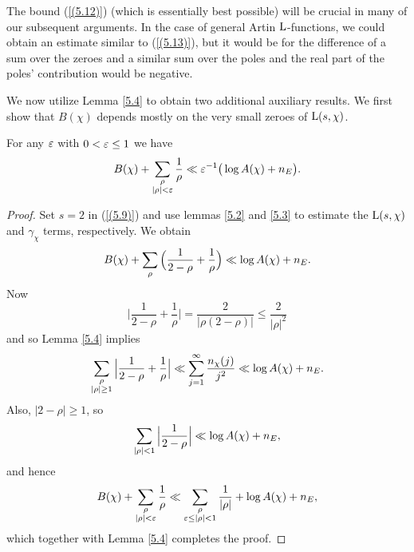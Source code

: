 \documentclass[./main]{subfiles}
\begin{document}
The bound (\ref{(5.12)}) (which is essentially best possible) will be crucial in many of our subsequent arguments. In the case of general Artin $\operatorname{L}$-functions, we could obtain an estimate similar to (\ref{(5.13)}), but it would be for the difference of a sum over the zeroes and a similar sum over the poles and the real part of the poles' contribution would be negative.

We now utilize Lemma \ref{5.4} to obtain two additional auxiliary results. We first show that $B(\chi)$ depends mostly on the very small zeroes of $\operatorname{L}(s,\chi)$.
\begin{lemma}\label{5.5}
For any $\varepsilon$ with $0 < \varepsilon \leq 1$ we have
\[B(\chi) + \sum_{\substack{\rho\\|\rho|<\varepsilon}}{\frac{1}{\rho}}\ll \varepsilon^{-1}\big(\log{A(\chi)}+n_E\big).\]
\end{lemma}
\begin{proof}
Set $s=2$ in (\ref{(5.9)}) and use lemmas \ref{5.2} and \ref{5.3} to estimate the $\operatorname{L}(s,\chi)$ and $\gamma_\chi$ terms, respectively. We obtain
\[B(\chi) + \sum_{\rho}{\Big(\frac{1}{2-\rho}+\frac{1}{\rho}\Big)}\ll \log{A(\chi)}+n_E.\]
Now
\[\Big|\frac{1}{2-\rho}+\frac{1}{\rho}\Big| = \frac{2}{\big|\rho(2-\rho)\big|}\leq \frac{2}{|\rho|^2} \]
and so Lemma \ref{5.4} implies
\[\sum_{\substack{\rho\\|\rho|\geq1}}{\Big|\frac{1}{2-\rho}+\frac{1}{\rho}\Big|} \ll \sum_{j=1}^{\infty}{\frac{n_\chi(j)}{j^2}}\ll\log{A(\chi)}+n_E .\]
Also, $|2-\rho|\geq1$, so
\[\sum_{|\rho|<1}{\Big|\frac{1}{2-\rho}\Big|} \ll \log{A(\chi)}+n_E,\]
and hence
\[B(\chi) + \sum_{\substack{\rho \\ |\rho|<\varepsilon}}{\frac{1}{\rho}}\ll\sum_{\substack{\rho\\\varepsilon\leq|\rho|<1}}{\frac{1}{|\rho|}}+\log{A(\chi)}+n_E,\]
which together with Lemma \ref{5.4} completes the proof.
\end{proof}
\end{document}
